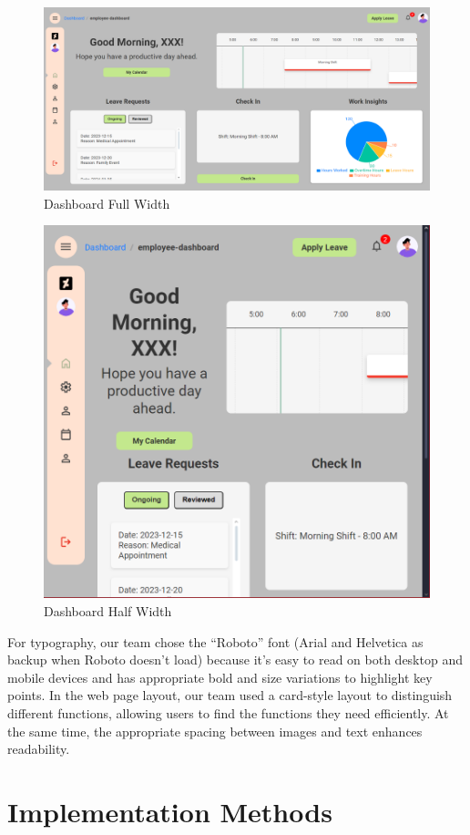 \documentclass[a4paper,12pt, oneside]{report}
\begin{document}
\begin{figure}[H]
    \centering
    \includegraphics[width=0.8\linewidth]{images/HomeE.png}
    \caption{Dashboard Full Width}
    \label{fig:home-e}
\end{figure}
 
\begin{figure}[H]
    \centering
    \includegraphics[width=0.65\linewidth]{images/HomeC.png}
    \caption{Dashboard Half Width}
    \label{fig:home-c}
\end{figure}

For typography, our team chose the “Roboto” font (Arial and Helvetica as backup when Roboto doesn't load) because it’s easy to read on both desktop and mobile devices and has appropriate bold and size variations to highlight key points. In the web page layout, our team used a card-style layout to distinguish different functions, allowing users to find the functions they need efficiently. At the same time, the appropriate spacing between images and text enhances readability.\\


\chapter{Implementation Methods}
\end{document}
